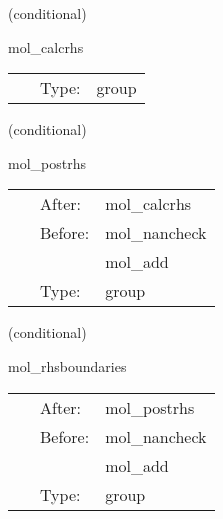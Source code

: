 \vspace{5mm}

   (conditional) 

\hspace{5mm} mol\_calcrhs 

\hspace{5mm}{\it physics thorns schedule the calculation of the discrete spatial operator in here } 


\hspace{5mm}

 \begin{tabular*}{160mm}{cll} 
~ & Type:  & group \\ 
\end{tabular*} 


\vspace{5mm}

   (conditional) 

\hspace{5mm} mol\_postrhs 

\hspace{5mm}{\it modify rhs functions } 


\hspace{5mm}

 \begin{tabular*}{160mm}{cll} 
~ & After:  & mol\_calcrhs \\ 
~ & Before:  & mol\_nancheck \\ 
~& ~ &mol\_add\\ 
~ & Type:  & group \\ 
\end{tabular*} 


\vspace{5mm}

   (conditional) 

\hspace{5mm} mol\_rhsboundaries 

\hspace{5mm}{\it any 'final' modifications to the rhs functions (boundaries etc.) } 


\hspace{5mm}

 \begin{tabular*}{160mm}{cll} 
~ & After:  & mol\_postrhs \\ 
~ & Before:  & mol\_nancheck \\ 
~& ~ &mol\_add\\ 
~ & Type:  & group \\ 
\end{tabular*} 


